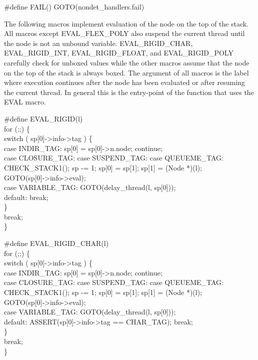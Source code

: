 \nwenddocs{}\plusendmoddef\nwstartdeflinemarkup{}\nwenddeflinemarkup
#define FAIL() GOTO(nondet_handlers.fail)

\nwendcode{}\nwdocspar
The following macros implement evaluation of the node on the top of
the stack. All macros except {\Tt{}EVAL{\_}FLEX{\_}POLY\nwendquote} also suspend the
current thread until the node is not an unbound variable.
{\Tt{}EVAL{\_}RIGID{\_}CHAR\nwendquote}, {\Tt{}EVAL{\_}RIGID{\_}INT\nwendquote}, {\Tt{}EVAL{\_}RIGID{\_}FLOAT\nwendquote}, and
{\Tt{}EVAL{\_}RIGID{\_}POLY\nwendquote} carefully check for unboxed values while the other
macros assume that the node on the top of the stack is always boxed.
The argument of all macros is the label where execution continues
after the node has been evaluated or after resuming the current
thread. In general this is the entry-point of the function that uses
the {\Tt{}EVAL\nwendquote} macro.

\nwenddocs{}\plusendmoddef\nwstartdeflinemarkup{}\nwenddeflinemarkup
#define EVAL_RIGID(l) \\
for (;;) \{ \\
    switch ( sp[0]->info->tag ) \{ \\
    case INDIR_TAG: sp[0] = sp[0]->n.node; continue; \\
    case CLOSURE_TAG: case SUSPEND_TAG: case QUEUEME_TAG: \\
        CHECK_STACK1(); sp -= 1; sp[0] = sp[1]; sp[1] = (Node *)(l); \\
        GOTO(sp[0]->info->eval); \\
    case VARIABLE_TAG: GOTO(delay_thread(l, sp[0])); \\
    default: break; \\
    \} \\
    break; \\
\}

#define EVAL_RIGID_CHAR(l) \\
for (;;) \{ \\
    switch ( sp[0]->info->tag ) \{ \\
    case INDIR_TAG: sp[0] = sp[0]->n.node; continue; \\
    case CLOSURE_TAG: case SUSPEND_TAG: case QUEUEME_TAG: \\
        CHECK_STACK1(); sp -= 1; sp[0] = sp[1]; sp[1] = (Node *)(l); \\
        GOTO(sp[0]->info->eval); \\
    case VARIABLE_TAG: GOTO(delay_thread(l, sp[0])); \\
    default: ASSERT(sp[0]->info->tag == CHAR_TAG); break; \\
    \} \\
    break; \\
\}

